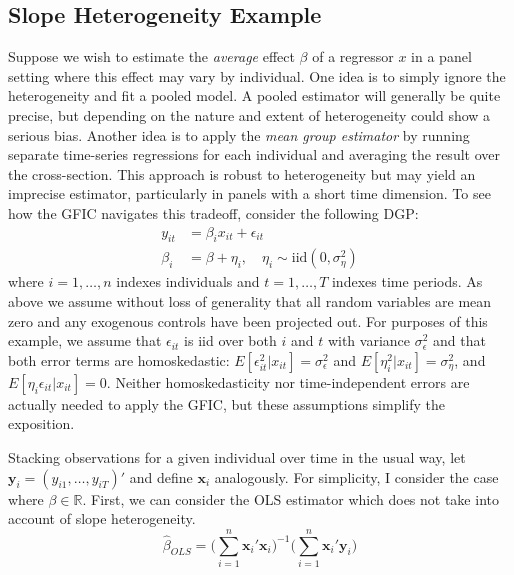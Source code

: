 \subsection{Slope Heterogeneity Example}

\label{sec:slopeHet}
Suppose we wish to estimate the \emph{average} effect $\beta$ of a regressor $x$ in a panel setting where this effect may vary by individual.
One idea is to simply ignore the heterogeneity and fit a pooled model.
A pooled estimator will generally be quite precise, but depending on the nature and extent of heterogeneity could show a serious bias.
Another idea is to apply the \emph{mean group estimator} by running separate time-series regressions for each individual and averaging the result over the cross-section.
This approach is robust to heterogeneity but may yield an imprecise estimator, particularly in panels with a short time dimension.
To see how the GFIC navigates this tradeoff, consider the following DGP:
	\begin{align}
				y_{it} &= \beta_i x_{it} + \epsilon_{it}\\
        \beta_i &= \beta + \eta_i, \quad \eta_i \sim \mbox{iid} (0, \sigma_\eta^2)
	\end{align}
where $i = 1, \hdots, n$ indexes individuals and $t=1, \hdots, T$ indexes time periods.
As above we assume without loss of generality that all random variables are mean zero and any exogenous controls have been projected out.
For purposes of this example, we assume that $\epsilon_{it}$ is iid over both $i$ and $t$ with variance $\sigma_\epsilon^2$ and that both error terms are homoskedastic: $E[\epsilon_{it}^2 | x_{it}] = \sigma_\epsilon^2$ and $E[\eta_i^2 | x_{it}] = \sigma_\eta^2$, and $E[\eta_i \epsilon_{it} | x_{it}] = 0$.
Neither homoskedasticity nor time-independent errors are actually needed to apply the GFIC, but these assumptions simplify the exposition.


Stacking observations for a given individual over time in the usual way, let $\mathbf{y}_i = (y_{i1}, \ldots, y_{iT})'$ and define $\mathbf{x}_i$ analogously. For simplicity, I consider the case where $\beta \in \mathbb{R}$. First, we can consider the OLS estimator which does not take into account of slope heterogeneity. 
	\begin{equation}
\widehat{\beta}_{OLS} = \bigg(\sum_{i=1}^{n} \mathbf{x}_i'  \mathbf{x}_i\bigg)^{-1}\bigg(\sum_{i=1}^{n} \mathbf{x}_i' \mathbf{y}_i   \bigg)	
	\end{equation}
	
